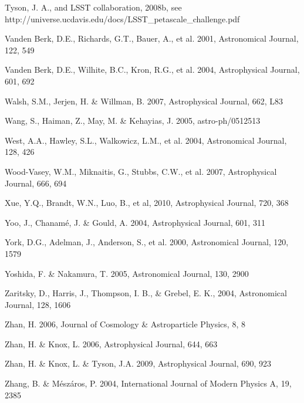 \documentclass{emulateapj}
\begin{document}
\begin{thebibliography}{}
\bibitem[()]{} Tyson, J. A., and LSST collaboration, 2008b, see 
                 http://universe.ucdavis.edu/docs/LSST\_petascale\_challenge.pdf 

\bibitem[()]{} Vanden Berk, D.E., Richards, G.T., Bauer, A., et al. 2001, Astronomical Journal, 122, 549

\bibitem[()]{} Vanden Berk, D.E., Wilhite, B.C., Kron, R.G., et al. 2004, Astrophysical Journal, 601, 692

\bibitem[()]{} Walsh, S.M., Jerjen, H. \& Willman, B. 2007, Astrophysical Journal, 662, L83

\bibitem[()]{} Wang, S., Haiman, Z., May, M. \& Kehayias, J. 2005, astro-ph/0512513

\bibitem[()]{} West, A.A., Hawley, S.L., Walkowicz, L.M., et al. 2004, Astronomical Journal, 128, 426

\bibitem[()]{} Wood-Vasey, W.M., Miknaitis, G., Stubbs, C.W., et al. 2007, Astrophysical Journal, 666, 694 

\bibitem[()]{} Xue, Y.Q., Brandt, W.N., Luo, B., et al, 2010,  Astrophysical Journal, 720, 368

\bibitem[()]{} Yoo, J., Chanam\'{e}, J. \& Gould, A. 2004, Astrophysical Journal, 601, 311

\bibitem[()]{} York, D.G., Adelman, J., Anderson, S., et al. 2000, Astronomical Journal, 120, 1579 

\bibitem[()]{} Yoshida, F. \& Nakamura, T. 2005, Astronomical Journal, 130, 2900 

\bibitem[()]{} Zaritsky, D., Harris, J., Thompson, I. B., \& Grebel, E. K., 2004, Astronomical Journal, 128, 1606

\bibitem[()]{} Zhan, H. 2006, Journal of Cosmology \& Astroparticle Physics, 8, 8

\bibitem[()]{} Zhan, H. \& Knox, L. 2006,  Astrophysical Journal, 644, 663

\bibitem[()]{} Zhan, H. \& Knox, L. \& Tyson, J.A. 2009,  Astrophysical Journal, 690, 923
	
\bibitem[()]{} Zhang, B. \& M\'{e}sz\'{a}ros, P. 2004, International Journal of Modern Physics A, 19, 2385

\end{thebibliography}
\end{document}
